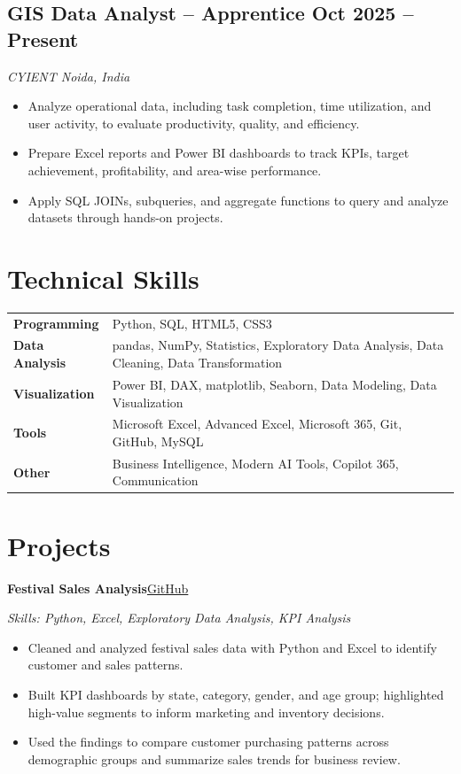 \documentclass[a4paper,10pt]{article}
\newcommand{\subtext}[1]{\textit{#1}\par\vspace{0.02cm}}
\newcommand{\hskills}[1]{\textbf{#1}}
\newcommand{\projecttitle}[2]{\noindent\textbf{#1}\hfill{\small\color{UI_blue}\href{#2}{GitHub}}\par\vspace{1pt}}
\newenvironment{zitemize}{\begin{itemize}}{\end{itemize}\vspace{0.02cm}}
\begin{document}
\subsection*{GIS Data Analyst -- Apprentice \hfill Oct 2025 -- Present}
\subtext{CYIENT \hfill Noida, India}
\begin{zitemize}
    \item Analyze operational data, including task completion, time utilization, and user activity, to evaluate productivity, quality, and efficiency.
    \item Prepare Excel reports and Power BI dashboards to track KPIs, target achievement, profitability, and area-wise performance.
    \item Apply SQL JOINs, subqueries, and aggregate functions to query and analyze datasets through hands-on projects.
\end{zitemize}

\section{Technical Skills}
\begin{tabularx}{\textwidth}{@{}p{2.5cm} X@{}}
\hskills{Programming} & Python, SQL, HTML5, CSS3 \\
\hskills{Data Analysis} & pandas, NumPy, Statistics, Exploratory Data Analysis, Data Cleaning, Data Transformation \\
\hskills{Visualization} & Power BI, DAX, matplotlib, Seaborn, Data Modeling, Data Visualization \\
\hskills{Tools} & Microsoft Excel, Advanced Excel, Microsoft 365, Git, GitHub, MySQL \\
\hskills{Other} & Business Intelligence, Modern AI Tools, Copilot 365, Communication
\end{tabularx}

\section{Projects}
\projecttitle{Festival Sales Analysis}{https://github.com/KalpanaBharti/Festival-Sales-Analysis}
\subtext{Skills: Python, Excel, Exploratory Data Analysis, KPI Analysis}
\begin{zitemize}
    \item Cleaned and analyzed festival sales data with Python and Excel to identify customer and sales patterns.
    \item Built KPI dashboards by state, category, gender, and age group; highlighted high-value segments to inform marketing and inventory decisions.
    \item Used the findings to compare customer purchasing patterns across demographic groups and summarize sales trends for business review.
\end{zitemize}
\end{document}

